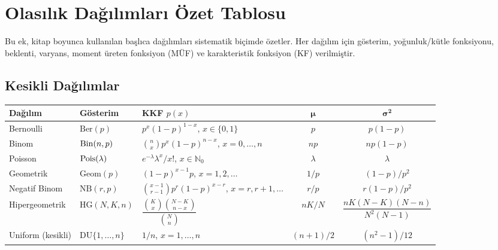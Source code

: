 \chapter{Olasılık Dağılımları Özet Tablosu}
\label{app:dagilim_tablosu}

Bu ek, kitap boyunca kullanılan başlıca dağılımları sistematik biçimde özetler. Her dağılım için gösterim, yoğunluk/kütle fonksiyonu, beklenti, varyans, moment üreten fonksiyon (MÜF) ve karakteristik fonksiyon (KF) verilmiştir.

\section{Kesikli Dağılımlar}
\label{app:kesikli_dag}

\begin{center}
\renewcommand{\arraystretch}{1.6}
\small
\begin{tabular}{p{2.4cm}p{1.8cm}p{4.2cm}cc}
\hline
\textbf{Dağılım} & \textbf{Gösterim} & \textbf{KKF} $p(x)$ & $\boldsymbol{\mu}$ & $\boldsymbol{\sigma^2}$ \\
\hline
Bernoulli & $\mathrm{Ber}(p)$ & $p^x(1-p)^{1-x}$, $x\in\{0,1\}$ & $p$ & $p(1-p)$ \\
Binom & $\operatorname{Bin}(n,p)$ & $\binom{n}{x}p^x(1-p)^{n-x}$, $x=0,\ldots,n$ & $np$ & $np(1-p)$ \\
Poisson & $\operatorname{Pois}(\lambda)$ & $e^{-\lambda}\lambda^x/x!$, $x\in\mathbb{N}_0$ & $\lambda$ & $\lambda$ \\
Geometrik & $\mathrm{Geom}(p)$ & $(1-p)^{x-1}p$, $x=1,2,\ldots$ & $1/p$ & $(1-p)/p^2$ \\
Negatif Binom & $\mathrm{NB}(r,p)$ & $\binom{x-1}{r-1}p^r(1-p)^{x-r}$, $x=r,r+1,\ldots$ & $r/p$ & $r(1-p)/p^2$ \\
Hipergeometrik & $\mathrm{HG}(N,K,n)$ & $\dfrac{\binom{K}{x}\binom{N-K}{n-x}}{\binom{N}{n}}$ & $nK/N$ & $\dfrac{nK(N-K)(N-n)}{N^2(N-1)}$ \\
Uniform (kesikli) & $\mathrm{DU}\{1,\ldots,n\}$ & $1/n$, $x=1,\ldots,n$ & $(n+1)/2$ & $(n^2-1)/12$ \\
\hline
\end{tabular}
\end{center}

